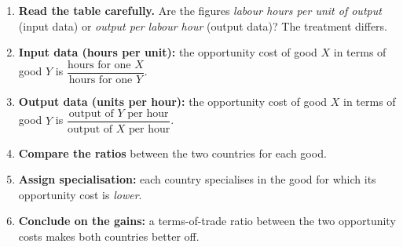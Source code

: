 \documentclass[11pt]{article}
\begin{document}
\begin{methode}
\begin{enumerate}
\item \textbf{Read the table carefully.} Are the figures \emph{labour hours per unit of output} (input data) or \emph{output per labour hour} (output data)? The treatment differs.
\item \textbf{Input data (hours per unit):} the opportunity cost of good $X$ in terms of good $Y$ is $\dfrac{\text{hours for one } X}{\text{hours for one } Y}$.
\item \textbf{Output data (units per hour):} the opportunity cost of good $X$ in terms of good $Y$ is $\dfrac{\text{output of } Y \text{ per hour}}{\text{output of } X \text{ per hour}}$.
\item \textbf{Compare the ratios} between the two countries for each good.
\item \textbf{Assign specialisation:} each country specialises in the good for which its opportunity cost is \emph{lower}.
\item \textbf{Conclude on the gains:} a terms-of-trade ratio between the two opportunity costs makes both countries better off.
\end{enumerate}
\end{methode}
\end{document}
